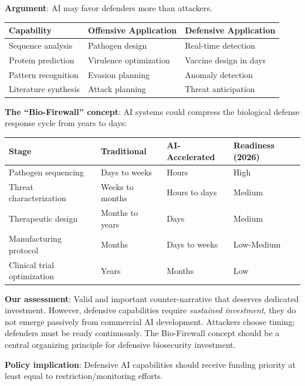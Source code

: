 \documentclass[11pt,letterpaper]{article}
\begin{document}
\textbf{Argument}: AI may favor defenders more than attackers.

\begin{center}
\small
\begin{tabular}{L{3cm}L{4cm}L{4cm}}
\toprule
\textbf{Capability} & \textbf{Offensive Application} & \textbf{Defensive Application} \\
\midrule
Sequence analysis & Pathogen design & Real-time detection \\
Protein prediction & Virulence optimization & Vaccine design in days \\
Pattern recognition & Evasion planning & Anomaly detection \\
Literature synthesis & Attack planning & Threat anticipation \\
\bottomrule
\end{tabular}
\end{center}

\textbf{The ``Bio-Firewall'' concept}: AI systems could compress the biological defense response cycle from years to days:

\begin{center}
\small
\begin{tabular}{L{3.5cm}L{2.5cm}L{2.5cm}L{3.5cm}}
\toprule
\textbf{Stage} & \textbf{Traditional} & \textbf{AI-Accelerated} & \textbf{Readiness (2026)} \\
\midrule
Pathogen sequencing & Days to weeks & Hours & High \\
Threat characterization & Weeks to months & Hours to days & Medium \\
Therapeutic design & Months to years & Days & Medium \\
Manufacturing protocol & Months & Days to weeks & Low-Medium \\
Clinical trial optimization & Years & Months & Low \\
\bottomrule
\end{tabular}
\end{center}

\textbf{Our assessment}: Valid and important counter-narrative that deserves dedicated investment. However, defensive capabilities require \textit{sustained investment}, they do not emerge passively from commercial AI development. Attackers choose timing; defenders must be ready continuously. The Bio-Firewall concept should be a central organizing principle for defensive biosecurity investment.

\textbf{Policy implication}: Defensive AI capabilities should receive funding priority at least equal to restriction/monitoring efforts.
\end{document}
